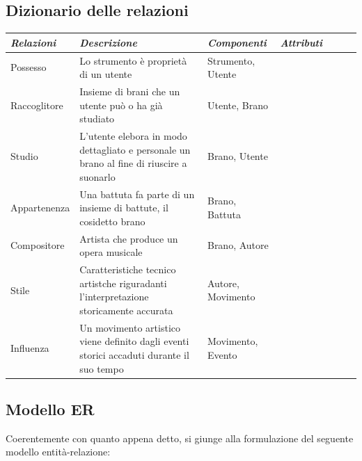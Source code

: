 \documentclass{article}
\begin{document}
    \subsection{Dizionario delle relazioni}

    \begin{tabular}{l p{5cm} p{3cm} p{2cm} l l l}
        \toprule
        \textbf{\textit{Relazioni}} & \textbf{\textit{Descrizione}} & \textbf{\textit{Componenti}} & \textbf{\textit{Attributi}} \\
        \midrule
        Possesso & Lo strumento è proprietà di un utente & Strumento, \newline Utente & \\
        \midrule
        Raccoglitore & Insieme di brani che un utente può o ha già studiato & Utente, \newline Brano & \\
        \midrule
        Studio & L'utente elebora in modo dettagliato e personale un brano al fine di riuscire a suonarlo & Brano, \newline Utente & \\
        \midrule
        Appartenenza & Una battuta fa parte di un insieme di battute, il cosidetto brano & Brano, \newline Battuta & \\
        \midrule
        Compositore & Artista che produce un opera musicale & Brano, \newline Autore & \\
        \midrule
        Stile & Caratteristiche tecnico artistche riguradanti l'interpretazione storicamente accurata & Autore, \newline Movimento \\
        \midrule
        Influenza & Un movimento artistico viene definito dagli eventi storici accaduti durante il suo tempo & Movimento, \newline Evento & \\
        \bottomrule
    \end{tabular}

    \newpage

    \subsection{Modello ER}

    Coerentemente con quanto appena detto, si giunge alla formulazione del seguente modello entità-relazione:
\end{document}
